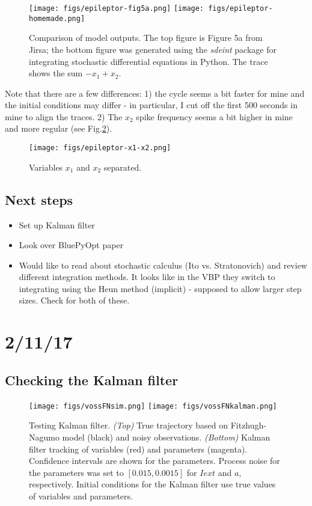 \documentclass[11pt]{article}
\begin{document}
	\begin{figure}[htbp!][hb]
		\centering
		\texttt{[image: figs/epileptor-fig5a.png]}
		\texttt{[image: figs/epileptor-homemade.png]}
		\caption{Comparison of model outputs. The top figure is Figure 5a from Jirsa; the bottom figure was generated using the \textit{sdeint} package for integrating stochastic differential equations in Python. The trace shows the sum $-x_1 + x_2$.}
		\label{fig:papercheck}
	\end{figure}

	Note that there are a few differences: 1) the cycle seems a bit faster for mine and the initial conditions may differ - in particular, I cut off the first 500 seconds in mine to align the traces. 2) The $x_2$ spike frequency seems a bit higher in mine and more regular (see Fig.\ref{fig:sepx1x2}).

	\begin{figure}[htbp!][htbp!]
		\centering
		\texttt{[image: figs/epileptor-x1-x2.png]}
		\caption{Variables $x_1$ and $x_2$ separated.}
		\label{fig:sepx1x2}
	\end{figure}

	\subsection{Next steps}
	\begin{itemize}
		\item Set up Kalman filter
		\item Look over BluePyOpt paper \cite{Van-Geit:2016aa}
		\item Would like to read about stochastic calculus (Ito vs. Stratonovich) and review different integration methods. It looks like in the VBP they switch to integrating using the Heun method (implicit) - supposed to allow larger step sizes. Check \cite{Kloeden:1995aa} for both of these. 
	\end{itemize}

\section{2/11/17}
		\subsection{Checking the Kalman filter} %
			\label{sub:check_kalman_filter}

			\begin{figure}[htbp!]
			\texttt{[image: figs/vossFNsim.png]}
			\texttt{[image: figs/vossFNkalman.png]}
			\caption{Testing Kalman filter. \textit{(Top)} True trajectory based on Fitzhugh-Nagumo model (black) and noisy observations. \textit{(Bottom)} Kalman filter tracking of variables (red) and parameters (magenta). Confidence intervals are shown for the parameters. Process noise for the parameters was set to $[0.015, 0.0015]$ for $Iext$ and $a$, respectively. Initial conditions for the Kalman filter use true values of variables and parameters. }
			\label{fig:kalmantestFN}
			\end{figure}
\end{document}
